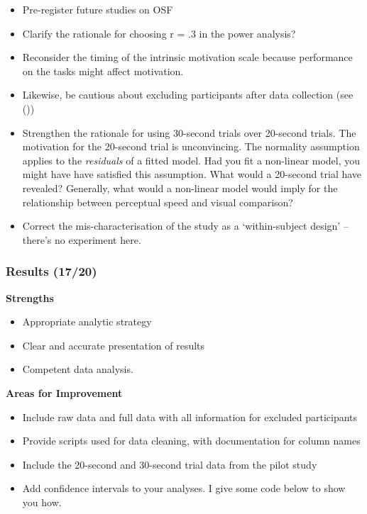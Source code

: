 \documentclass[
  single column]{article}
\providecommand{\tightlist}{%
  \setlength{\itemsep}{0pt}\setlength{\parskip}{0pt}}\usepackage{longtable,booktabs,array}
\begin{document}
\begin{itemize}
\tightlist
\item
  Pre-register future studies on OSF
\item
  Clarify the rationale for choosing r = .3 in the power analysis?
\item
  Reconsider the timing of the intrinsic motivation scale because
  performance on the tasks might affect motivation.
\item
  Likewise, be cautious about excluding participants after data
  collection (see ())
\item
  Strengthen the rationale for using 30-second trials over 20-second
  trials. The motivation for the 20-second trial is unconvincing. The
  normality assumption applies to the \emph{residuals} of a fitted
  model. Had you fit a non-linear model, you might have have satisfied
  this assumption. What would a 20-second trial have revealed?
  Generally, what would a non-linear model would imply for the
  relationship between perceptual speed and visual comparison?
\item
  Correct the mis-characterisation of the study as a `within-subject
  design' -- there's no experiment here.
\end{itemize}

\subsubsection{Results (17/20)}\label{results-1720}

\textbf{Strengths}

\begin{itemize}
\tightlist
\item
  Appropriate analytic strategy
\item
  Clear and accurate presentation of results
\item
  Competent data analysis.
\end{itemize}

\textbf{Areas for Improvement}

\begin{itemize}
\tightlist
\item
  Include raw data and full data with all information for excluded
  participants
\item
  Provide scripts used for data cleaning, with documentation for column
  names
\item
  Include the 20-second and 30-second trial data from the pilot study
\item
  Add confidence intervals to your analyses. I give some code below to
  show you how.
\end{itemize}
\end{document}
